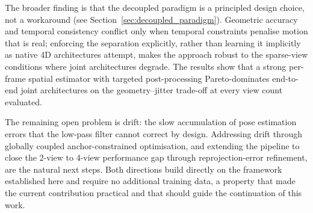 The broader finding is that the decoupled paradigm is a principled design choice, not a workaround (see Section~\ref{sec:decoupled_paradigm}).
Geometric accuracy and temporal consistency conflict only when temporal constraints
penalise motion that is real; enforcing the separation explicitly, rather than
learning it implicitly as native 4D architectures attempt, makes the approach
robust to the sparse-view conditions where joint architectures degrade. The
results show that a strong per-frame spatial estimator with targeted
post-processing Pareto-dominates end-to-end joint architectures on the
geometry--jitter trade-off at every view count evaluated.

The remaining open problem is drift: the slow accumulation of pose estimation errors
that the low-pass filter cannot correct by design. Addressing drift through globally
coupled anchor-constrained optimisation, and extending the pipeline to close the
2-view to 4-view performance gap through reprojection-error refinement, are the natural
next steps. Both directions build directly on the framework established here and require
no additional training data, a property that made the current contribution practical
and that should guide the continuation of this work.
